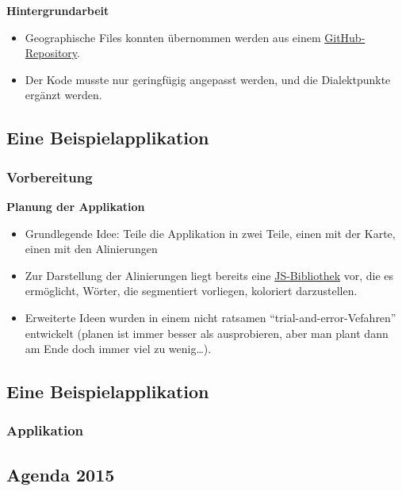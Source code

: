 \textbf{Hintergrundarbeit}

\begin{itemize}
\itemsep1pt\parskip0pt
\item
  Geographische Files konnten übernommen werden aus einem
  \href{https://github.com/clemsos/d3-china-map}{GitHub-Repository}.
\item
  Der Kode musste nur geringfügig angepasst werden, und die
  Dialektpunkte ergänzt werden.
\end{itemize}

\subsection{\texorpdfstring{{Eine
Beispielapplikation}}{Eine Beispielapplikation}}

\subsubsection{\texorpdfstring{{Vorbereitung}}{Vorbereitung}}

\textbf{Planung der Applikation}

\begin{itemize}
\itemsep1pt\parskip0pt
\item
  Grundlegende Idee: Teile die Applikation in zwei Teile, einen mit der
  Karte, einen mit den Alinierungen
\item
  Zur Darstellung der Alinierungen liegt bereits eine
  \href{http://github.com/dighl/prison}{JS-Bibliothek} vor, die es
  ermöglicht, Wörter, die segmentiert vorliegen, koloriert darzustellen.
\item
  Erweiterte Ideen wurden in einem nicht ratsamen
  ``trial-and-error-Vefahren'' entwickelt (planen ist immer besser als
  ausprobieren, aber man plant dann am Ende doch immer viel zu
  wenig\ldots{}).
\end{itemize}

\subsection{\texorpdfstring{{Eine
Beispielapplikation}}{Eine Beispielapplikation}}

\subsubsection{\texorpdfstring{{Applikation}}{Applikation}}

\subsection{\texorpdfstring{{Agenda 2015}}{Agenda 2015}}

